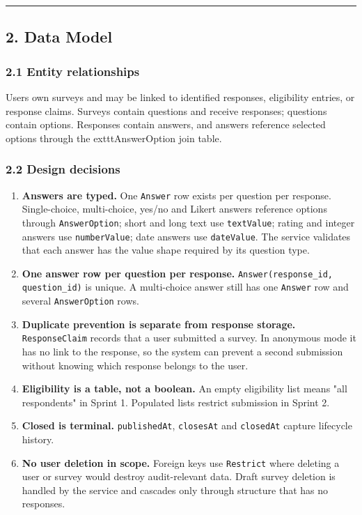 \documentclass[12pt,a4paper]{article}
\begin{document}
\medskip\noindent\rule{\linewidth}{0.4pt}\medskip

\subsection*{2. Data Model}
\subsubsection*{2.1 Entity relationships}
Users own surveys and may be linked to identified responses, eligibility entries, or response claims. Surveys contain questions and receive responses; questions contain options. Responses contain answers, and answers reference selected options through the 	exttt{AnswerOption} join table.

\subsubsection*{2.2 Design decisions}
\begin{enumerate}[leftmargin=*]
\item \textbf{Answers are typed.} One \texttt{Answer} row exists per question per response. Single-choice, multi-choice, yes/no and Likert answers reference options through \texttt{AnswerOption}; short and long text use \texttt{textValue}; rating and integer answers use \texttt{numberValue}; date answers use \texttt{dateValue}. The service validates that each answer has the value shape required by its question type.
\item \textbf{One answer row per question per response.} \texttt{Answer(response\_id, question\_id)} is unique. A multi-choice answer still has one \texttt{Answer} row and several \texttt{AnswerOption} rows.
\item \textbf{Duplicate prevention is separate from response storage.} \texttt{ResponseClaim} records that a user submitted a survey. In anonymous mode it has no link to the response, so the system can prevent a second submission without knowing which response belongs to the user.
\item \textbf{Eligibility is a table, not a boolean.} An empty eligibility list means "all respondents" in Sprint 1. Populated lists restrict submission in Sprint 2.
\item \textbf{Closed is terminal.} \texttt{publishedAt}, \texttt{closesAt} and \texttt{closedAt} capture lifecycle history.
\item \textbf{No user deletion in scope.} Foreign keys use \texttt{Restrict} where deleting a user or survey would destroy audit-relevant data. Draft survey deletion is handled by the service and cascades only through structure that has no responses.
\end{enumerate}
\end{document}

